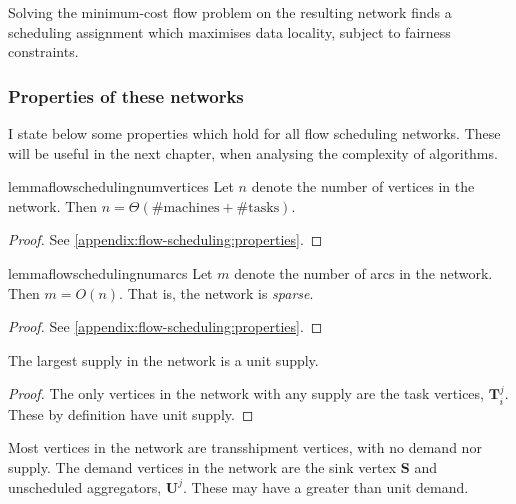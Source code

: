 Solving the minimum-cost flow problem on the resulting network finds a scheduling assignment which maximises data locality, subject to fairness constraints.


\subsubsection{Properties of these networks}


I state below some properties which hold for all flow scheduling networks. These will be useful in the next chapter, when analysing the complexity of algorithms. \\

\begin{restatable}{lemma}{flowschedulingnumvertices}
\label{lemma:network-num-vertices}
Let $n$ denote the number of vertices in the network. Then $n = \Theta\left(\text{\# machines} + \text{\# tasks}\right)$.
\end{restatable}
\begin{proof}
See \cref{appendix:flow-scheduling:properties}.
\end{proof}

\begin{restatable}{lemma}{flowschedulingnumarcs} 
\label{lemma:network-num-arcs}
Let $m$ denote the number of arcs in the network. Then $m = O(n)$. That is, the network is \emph{sparse}.
\end{restatable}
\begin{proof}
See \cref{appendix:flow-scheduling:properties}.
\end{proof}

\begin{lemma} \label{lemma:network-supply}
The largest supply in the network is a unit supply.
\end{lemma}
\begin{proof}
The only vertices in the network with any supply are the task vertices, $\mathbf{T}_i^j$. These by definition have unit supply.
\end{proof}

\begin{remark}
Most vertices in the network are transshipment vertices, with no demand nor supply. The demand vertices in the network are the sink vertex $\mathbf{S}$ and unscheduled aggregators, $\mathbf{U}^j$. These may have a greater than unit demand.
\end{remark}

